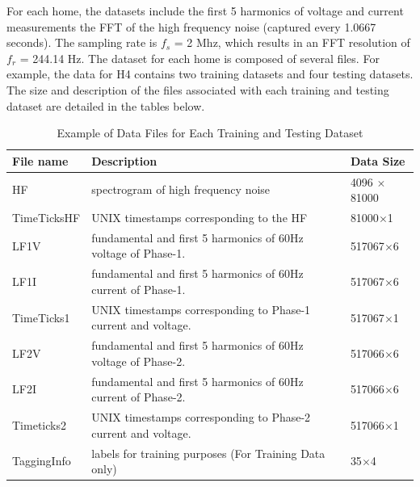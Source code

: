 \documentclass[11pt, letterpaper]{article}
\begin{document}
For each home, the datasets include the first 5 harmonics of voltage and current measurements the FFT of the high frequency noise (captured every 1.0667 seconds).  The sampling rate is $f_s$ = 2 Mhz, which results in an FFT resolution of $f_r$ = 244.14 Hz. The dataset for each home is composed of several files.  For example, the data for H4 contains two training datasets and four testing datasets. The size and description of the files associated with each training and testing dataset are detailed in the tables below.

\begin{table}[h]
\caption{Example of Data Files for Each Training and Testing Dataset}\label{files}
\begin{center}
\begin{tabular}{|l|l|l|}\hline
\textbf{File name} & \textbf{Description} & \textbf{Data Size}\\
\hline
HF & spectrogram of high frequency noise & 4096 $\times$ 81000\\
\hline

TimeTicksHF &  UNIX timestamps corresponding to the HF & 81000$\times$1\\
 \hline

LF1V & fundamental and first 5 harmonics of 60Hz voltage of Phase-1. & 517067$\times$6\\
 \hline

LF1I & fundamental and first 5 harmonics of 60Hz current of Phase-1. & 517067$\times$6\\
 \hline

TimeTicks1 & UNIX timestamps corresponding to Phase-1 current and voltage. & 517067$\times$1\\
 \hline

LF2V & fundamental and first 5 harmonics of 60Hz voltage of Phase-2. &  517066$\times$6\\
 \hline

LF2I & fundamental and first 5 harmonics of 60Hz current of Phase-2. & 517066$\times$6\\
 \hline

Timeticks2 & UNIX timestamps corresponding to Phase-2 current and voltage. &  517066$\times$1\\
 \hline

TaggingInfo & labels for training purposes (For Training Data only) & 35$\times$4 \\
\hline
\end{tabular}
\end{center}
\end{table}
\end{document}
